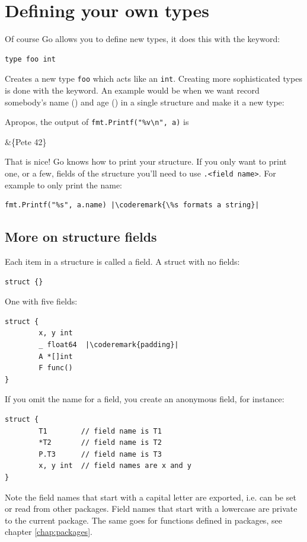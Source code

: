 \section{Defining your own types}
\label{sec:defining your own}
Of course Go allows you to define new types, it does this 
with the  keyword: 
\begin{lstlisting}
type foo int
\end{lstlisting}
Creates
a new type \lstinline{foo} which acts like an \lstinline{int}.
Creating more sophisticated types is done with the
keyword.
An example would be when we want record somebody's name ()
and age () in a single structure and make it a new type:

Apropos, the output of \lstinline{fmt.Printf("%v\n", a)} is 
\begin{display}
&\{Pete 42\}
\end{display}
That is nice!
Go knows how to print your structure. If you
only want to print one, or a few, fields of the structure you'll
need to use \verb|.<field name>|. For example to only print the name:
\begin{lstlisting}
fmt.Printf("%s", a.name) |\coderemark{\%s formats a string}|
\end{lstlisting}

\subsection{More on structure fields}
Each item in a structure is called a field. 
A struct with no fields:
\begin{lstlisting}
struct {}
\end{lstlisting}
One with five fields:
\begin{lstlisting}
struct {
        x, y int
        _ float64  |\coderemark{padding}|
        A *[]int
        F func()
}
\end{lstlisting}
If you omit the name for a field, you create an anonymous field, for
instance:
\begin{lstlisting}
struct {
        T1        // field name is T1
        *T2       // field name is T2
        P.T3      // field name is T3
        x, y int  // field names are x and y
}
\end{lstlisting}
Note the field names that start with a capital letter are exported, i.e. can be
set or read from other packages. Field names that start with a lowercase are private
to the current package. The same goes for functions defined in packages, see chapter
\ref{chap:packages}.

